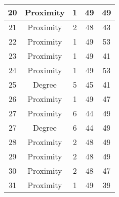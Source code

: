 \documentclass[results.tex]{subfiles}
\begin{document}
\begin{center}
\begin{tabular}{| c || c | c | c | c |}
            \hline
            20                      & Proximity                    & 1                      & 49                      & 49                   \\
            \hline
            21                      & Proximity                    & 2                      & 48                      & 43                   \\
            \hline
            22                      & Proximity                    & 1                      & 49                      & 53                   \\
            \hline
            23                      & Proximity                    & 1                      & 49                      & 41                   \\
            \hline
            24                      & Proximity                    & 1                      & 49                      & 53                   \\
            \hline
            25                      & Degree                       & 5                      & 45                      & 41                   \\
            \hline
            26                      & Proximity                    & 1                      & 49                      & 47                   \\
            \hline
            27                      & Proximity                    & 6                      & 44                      & 49                   \\
            \hline
            27                      & Degree                       & 6                      & 44                      & 49                   \\
            \hline
            28                      & Proximity                    & 2                      & 48                      & 49                   \\
            \hline
            29                      & Proximity                    & 2                      & 48                      & 49                   \\
            \hline
            30                      & Proximity                    & 2                      & 48                      & 47                   \\
            \hline
            31                      & Proximity                    & 1                      & 49                      & 39                   \\

\end{tabular}
\end{center}
\end{document}
